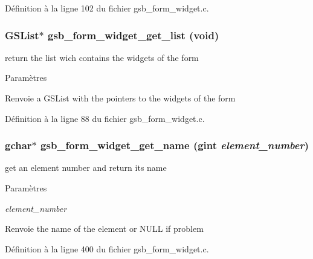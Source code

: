Définition à la ligne 102 du fichier gsb\_\-form\_\-widget.c.

\subsubsection[{gsb\_\-form\_\-widget\_\-get\_\-list}]{\setlength{\rightskip}{0pt plus 5cm}GSList$\ast$ gsb\_\-form\_\-widget\_\-get\_\-list (void)}\label{gsb__form__widget_8h_ad4885fdd3bce3607cf1aba2765864c35}
return the list wich contains the widgets of the form


\begin{DoxyParams}{Paramètres}
\item[{\em }]\end{DoxyParams}
\begin{DoxyReturn}{Renvoie}
a GSList with the pointers to the widgets of the form 
\end{DoxyReturn}


Définition à la ligne 88 du fichier gsb\_\-form\_\-widget.c.

\subsubsection[{gsb\_\-form\_\-widget\_\-get\_\-name}]{\setlength{\rightskip}{0pt plus 5cm}gchar$\ast$ gsb\_\-form\_\-widget\_\-get\_\-name (gint {\em element\_\-number})}\label{gsb__form__widget_8h_a48e129aec71bef3117effe95f85c4a12}
get an element number and return its name


\begin{DoxyParams}{Paramètres}
\item[{\em element\_\-number}]\end{DoxyParams}
\begin{DoxyReturn}{Renvoie}
the name of the element or NULL if problem 
\end{DoxyReturn}


Définition à la ligne 400 du fichier gsb\_\-form\_\-widget.c.


